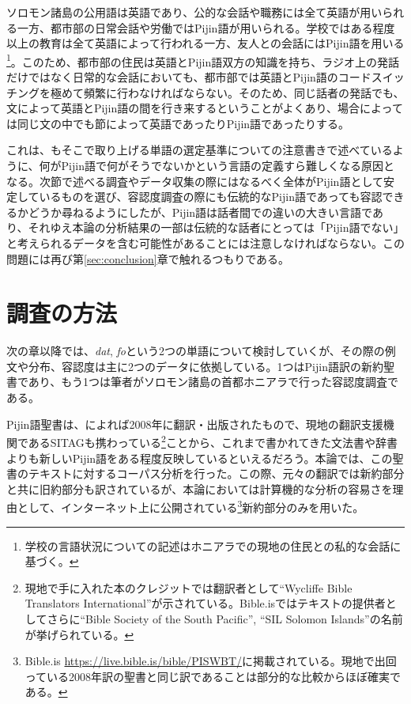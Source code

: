 ソロモン諸島の公用語は英語であり、公的な会話や職務には全て英語が用いられる一方、都市部の日常会話や労働ではPijin語が用いられる。学校ではある程度以上の教育は全て英語によって行われる一方、友人との会話にはPijin語を用いる\footnote{
学校の言語状況についての記述はホニアラでの現地の住民との私的な会話に基づく。
}。このため、都市部の住民は英語とPijin語双方の知識を持ち、ラジオ上の発話だけではなく日常的な会話においても、都市部では英語とPijin語のコードスイッチングを極めて頻繁に行わなければならない。そのため、同じ話者の発話でも、文によって英語とPijin語の間を行き来するということがよくあり、場合によっては同じ文の中でも節によって英語であったりPijin語であったりする。

これは、\cite{dictionary}もそこで取り上げる単語の選定基準についての注意書きで述べているように、何がPijin語で何がそうでないかという言語の定義すら難しくなる原因となる。次節で述べる調査やデータ収集の際にはなるべく全体がPijin語として安定しているものを選び、容認度調査の際にも伝統的なPijin語であっても容認できるかどうか尋ねるようにしたが、Pijin語は話者間での違いの大きい言語であり、それゆえ本論の分析結果の一部は伝統的な話者にとっては「Pijin語でない」と考えられるデータを含む可能性があることには注意しなければならない。この問題には再び第\ref{sec:conclusion}章で触れるつもりである。

\section{調査の方法}\label{sec:howexamined}
次の章以降では、\textit{dat}, \textit{fo}という2つの単語について検討していくが、その際の例文や分布、容認度は主に2つのデータに依拠している。1つはPijin語訳の新約聖書であり、もう1つは筆者がソロモン諸島の首都ホニアラで行った容認度調査である。

Pijin語聖書は、\cite{solomontimes}によれば2008年に翻訳・出版されたもので、現地の翻訳支援機関であるSITAGも携わっている\footnote{
現地で手に入れた本のクレジットでは翻訳者として``Wycliffe Bible Translators International''が示されている。Bible.isではテキストの提供者としてさらに``Bible Society of the South Pacific'', ``SIL Solomon Islands''の名前が挙げられている。}ことから、これまで書かれてきた文法書や辞書よりも新しいPijin語をある程度反映しているといえるだろう。本論では、この聖書のテキストに対するコーパス分析を行った。この際、元々の翻訳では新約部分と共に旧約部分も訳されているが、本論においては計算機的な分析の容易さを理由として、インターネット上に公開されている\footnote{
Bible.is \url{https://live.bible.is/bible/PISWBT/}に掲載されている。現地で出回っている2008年訳の聖書と同じ訳であることは部分的な比較からほぼ確実である。}新約部分のみを用いた。

